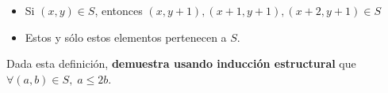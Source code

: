 \documentclass[oneside]{style}
\begin{document}
\begin{questions}[label=\protect\circled{\bfseries\arabic*}]
{\begin{itemize}
            \item Si $(x,y) \in S$, entonces $(x,y+1), (x+1,y+1), (x+2,y+1) 
            \in S$

            \item Estos y sólo estos elementos pertenecen a $S$. 
        \end{itemize}

        Dada esta definición, \textbf{demuestra usando inducción estructural}
        que $\forall(a,b) \in S, \; a \leq 2b$. 
    }
\end{questions}
\end{document}
